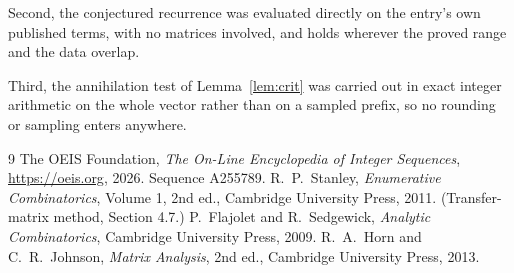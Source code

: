 \documentclass[11pt,a4paper]{article}
\theoremstyle{plain}
\theoremstyle{definition}
\begin{document}
Second, the conjectured recurrence was evaluated directly on the entry's own published terms,
with no matrices involved, and holds wherever the proved range and the data overlap.

Third, the annihilation test of Lemma~\ref{lem:crit} was carried out in exact integer
arithmetic on the whole vector rather than on a sampled prefix, so no rounding or sampling
enters anywhere.

\begin{thebibliography}{9}
 The OEIS Foundation, \emph{The On-Line Encyclopedia of Integer
Sequences}, \url{https://oeis.org}, 2026. Sequence A255789.
 R.~P.~Stanley, \emph{Enumerative Combinatorics}, Volume 1, 2nd ed.,
Cambridge University Press, 2011. (Transfer-matrix method, Section 4.7.)
 P.~Flajolet and R.~Sedgewick, \emph{Analytic Combinatorics}, Cambridge
University Press, 2009.
 R.~A.~Horn and C.~R.~Johnson, \emph{Matrix Analysis}, 2nd ed., Cambridge
University Press, 2013.
\end{thebibliography}
\end{document}
